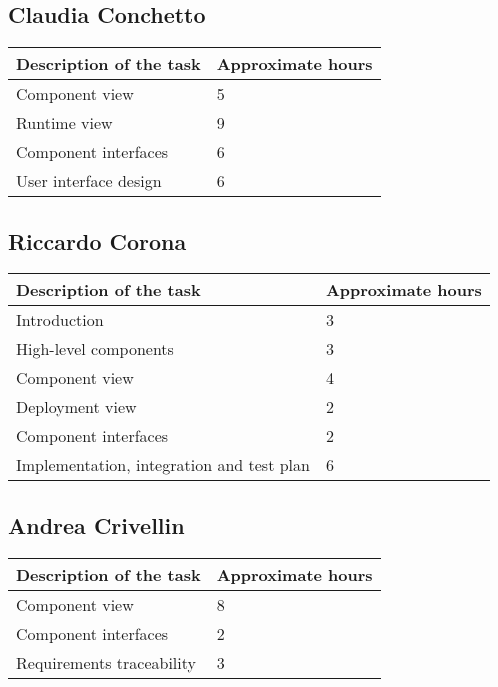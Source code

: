 
%

\subsection{Claudia Conchetto}
\begin{table}[h!]
\begin{tabular}{|l|l|}
\hline
\textbf{Description of the task} & \textbf{Approximate hours} \\ \hline
Component view & 5 \\ \hline
Runtime view & 9 \\ \hline
Component interfaces & 6 \\ \hline
User interface design & 6 \\ \hline
\end{tabular}
\end{table}

\subsection{Riccardo Corona}
\begin{table}[h!]
\begin{tabular}{|l|l|}
\hline
\textbf{Description of the task} & \textbf{Approximate hours} \\ \hline
Introduction & 3 \\ \hline
High-level components & 3 \\ \hline
Component view & 4 \\ \hline
Deployment view & 2 \\ \hline
Component interfaces & 2 \\ \hline
Implementation, integration and test plan & 6 \\ \hline
\end{tabular}
\end{table}

\subsection{Andrea Crivellin}
\begin{table}[h!]
\begin{tabular}{|l|l|}
\hline
\textbf{Description of the task} & \textbf{Approximate hours} \\ \hline
Component view & 8 \\ \hline
Component interfaces & 2 \\ \hline
Requirements traceability & 3 \\ \hline
\end{tabular}
\end{table}

%